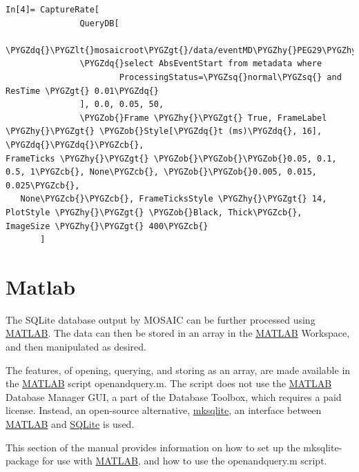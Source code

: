 \documentclass[letterpaper,10pt,english]{sphinxmanual}
\def\PYGZob{\char`\{}
\def\PYGZcb{\char`\}}
\def\PYGZlt{\char`\<}
\def\PYGZgt{\char`\>}
\def\PYGZhy{\char`\-}
\def\PYGZsq{\char`\'}
\def\PYGZdq{\char`\"}
\renewcommand\PYGZsq{\textquotesingle}
\begin{document}
\begin{Verbatim}[commandchars=\\\{\}]
       In[4]= CaptureRate[
               QueryDB[
               \PYGZdq{}\PYGZlt{}mosaicroot\PYGZgt{}/data/eventMD\PYGZhy{}PEG29\PYGZhy{}Reference.sqlite\PYGZdq{},
               \PYGZdq{}select AbsEventStart from metadata where
                       ProcessingStatus=\PYGZsq{}normal\PYGZsq{} and ResTime \PYGZgt{} 0.01\PYGZdq{}
               ], 0.0, 0.05, 50,
               \PYGZob{}Frame \PYGZhy{}\PYGZgt{} True, FrameLabel \PYGZhy{}\PYGZgt{} \PYGZob{}Style[\PYGZdq{}t (ms)\PYGZdq{}, 16], \PYGZdq{}\PYGZdq{}\PYGZcb{},
FrameTicks \PYGZhy{}\PYGZgt{} \PYGZob{}\PYGZob{}\PYGZob{}0.05, 0.1, 0.5, 1\PYGZcb{}, None\PYGZcb{}, \PYGZob{}\PYGZob{}0.005, 0.015, 0.025\PYGZcb{},
   None\PYGZcb{}\PYGZcb{}, FrameTicksStyle \PYGZhy{}\PYGZgt{} 14, PlotStyle \PYGZhy{}\PYGZgt{} \PYGZob{}Black, Thick\PYGZcb{},
ImageSize \PYGZhy{}\PYGZgt{} 400\PYGZcb{}
       ]
\end{Verbatim}
\begin{figure}[htbp]\begin{flushleft}

\texttt{[image: \{mathematica-CaptureRate-Formatted]}.png}
\end{flushleft}\end{figure}


\section{Matlab}
\label{doc/Addons:matlab-addons-sec}\label{doc/Addons:id2}
The SQLite database output by MOSAIC can be further processed using \href{http://www.mathworks.com/products/matlab/}{MATLAB}.  The data can then be stored in an array in the \href{http://www.mathworks.com/products/matlab/}{MATLAB} Workspace, and then manipulated as desired.

The features, of opening, querying, and storing as an array, are made available in the \href{http://www.mathworks.com/products/matlab/}{MATLAB} script openandquery.m. The script does not use the \href{http://www.mathworks.com/products/matlab/}{MATLAB} Database Manager GUI, a part of the Database Toolbox, which requires a paid license.  Instead, an open-source alternative, \href{http://sourceforge.net/projects/mksqlite/}{mksqlite}, an interface between \href{http://www.mathworks.com/products/matlab/}{MATLAB} and \href{http://www.sqlite.org/}{SQLite} is used.

This section of the manual provides information on how to set up the mksqlite- package for use with \href{http://www.mathworks.com/products/matlab/}{MATLAB}, and how to use the openandquery.m script.
\end{document}
